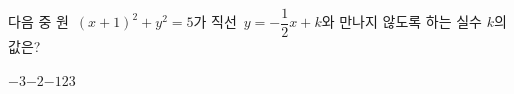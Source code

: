 다음 중 원~$(x+1)^2+y^2=5$가 직선~$y=-\dfrac{1}{2}x+k$와 만나지 않도록 하는 실수 $k$의 값은?
\begin{choices32}{$-3$}{$-2$}{$-1$}{$2$}{$3$}\end{choices32}
